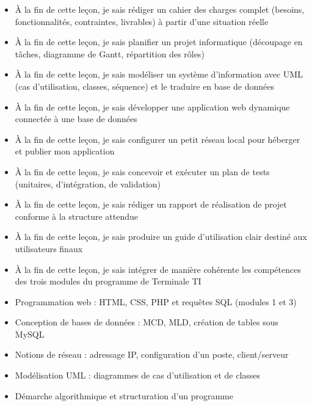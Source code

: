 \documentclass[11pt]{article}
\begin{document}
\begin{objectifs}
\begin{itemize}
\item À la fin de cette leçon, je sais rédiger un cahier des charges complet (besoins, fonctionnalités, contraintes, livrables) à partir d'une situation réelle
\item À la fin de cette leçon, je sais planifier un projet informatique (découpage en tâches, diagramme de Gantt, répartition des rôles)
\item À la fin de cette leçon, je sais modéliser un système d'information avec UML (cas d'utilisation, classes, séquence) et le traduire en base de données
\item À la fin de cette leçon, je sais développer une application web dynamique connectée à une base de données
\item À la fin de cette leçon, je sais configurer un petit réseau local pour héberger et publier mon application
\item À la fin de cette leçon, je sais concevoir et exécuter un plan de tests (unitaires, d'intégration, de validation)
\item À la fin de cette leçon, je sais rédiger un rapport de réalisation de projet conforme à la structure attendue
\item À la fin de cette leçon, je sais produire un guide d'utilisation clair destiné aux utilisateurs finaux
\item À la fin de cette leçon, je sais intégrer de manière cohérente les compétences des trois modules du programme de Terminale TI
\end{itemize}
\end{objectifs}

\begin{prerequis}
\begin{itemize}
\item Programmation web : HTML, CSS, PHP et requêtes SQL (modules 1 et 3)
\item Conception de bases de données : MCD, MLD, création de tables sous MySQL
\item Notions de réseau : adressage IP, configuration d'un poste, client/serveur
\item Modélisation UML : diagrammes de cas d'utilisation et de classes
\item Démarche algorithmique et structuration d'un programme
\end{itemize}
\end{prerequis}
\end{document}
